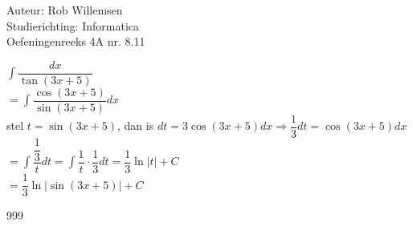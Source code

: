 \documentclass[a4paper]{article}
\newcommand{\dint}{\displaystyle\int}
\begin{document}
\noindent \large Auteur: Rob Willemsen \\
\noindent \large Studierichting: Informatica \\
\noindent \large Oefeningenreeks 4A nr. 8.11 \\

\medskip

\normalsize

$\dint \dfrac{dx}{\tan(3x+5)}$ \\

$= \dint \dfrac{\cos(3x+5)}{\sin(3x+5)} dx$ \\

stel $t = \sin(3x+5)$, dan is $dt = 3\cos(3x+5) dx \Rightarrow \dfrac{1}{3}dt = \cos(3x+5) dx$ \\

$= \dint \dfrac{\dfrac{1}{3}}{t}dt = \dint \dfrac{1}{t} \cdot \dfrac{1}{3} dt = \dfrac{1}{3} \ln|t| + C$ \\

$= \dfrac{1}{3} \ln|\sin(3x+5)| + C$ \\

\begin{thebibliography}{999}
\end{thebibliography}
\end{document}

